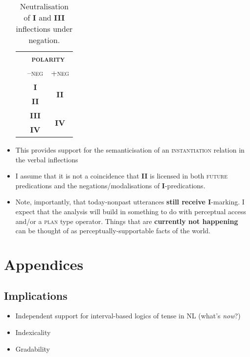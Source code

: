 \documentclass[11pt,dvipsnames]{article}
\begin{document}
\begin{itemize}
	
	\begin{table}[h]\centering
		\begin{tabular}{ccc}
			&\multicolumn{2}{c}{\textsc{\textbf{polarity}}} \\
			& \textsc{--neg} & \textsc{+neg}\\\midrule
			&	\textbf{I} & \multirow{2}{*}{\textbf{II}}\\
			& \textbf{II} \\\midrule
			&	\textbf{III} & \multirow{2}{*}{\textbf{IV}}\\
			& \textbf{IV} \\\bottomrule
		\end{tabular}
		\caption{Neutralisation of \textbf{I} and \textbf{III} inflections under negation.}\label{negneut}
	\end{table}
	
	\item This provides support for the semanticisation of an \textsc{instantiation} relation in the verbal inflections
	
	\item I assume that it is not a coincidence that \textbf{II} is licensed in both \textsc{future} predications and the negations/modalisations of \textbf{I}-predications.
	
	\item Note, importantly, that today-nonpast utterances \textbf{still receive I}-marking. I expect that the analysis will build in something to do with perceptual access and/or a \textsc{plan} type operator. Things that are \textbf{currently not happening} can be thought of as perceptually-supportable facts of the world. 
	
	
	
	
\end{itemize}
\newpage
\small
\section*{Appendices}

\subsection*{Implications}

\begin{itemize}
	\item Independent support for interval-based logics of tense in NL (what's \textit{now}?)
	\item Indexicality
	\item Gradability
\end{itemize}
\end{document}
